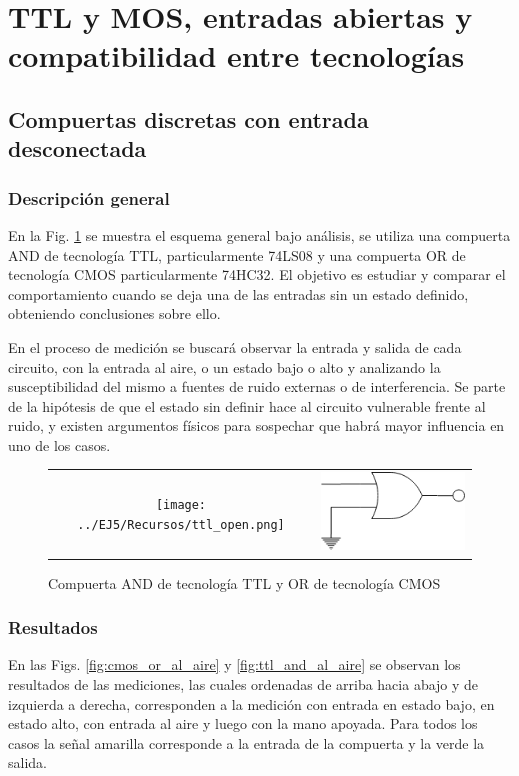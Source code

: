 \section{TTL y MOS, entradas abiertas y compatibilidad entre tecnolog\'ias}

\subsection{Compuertas discretas con entrada desconectada}

\subsubsection{Descripci\'on general}
En la Fig. \ref{fig:open_gate_circuits} se muestra el esquema general bajo an\'alisis, se utiliza una compuerta AND de tecnolog\'ia TTL,
particularmente 74LS08 y una compuerta OR de tecnolog\'ia CMOS particularmente 74HC32. El objetivo es estudiar y comparar el comportamiento
cuando se deja una de las entradas sin un estado definido, obteniendo conclusiones sobre ello.

En el proceso de medici\'on se buscar\'a observar la entrada y salida de cada circuito, con la entrada al aire, o un estado bajo o alto y analizando
la susceptibilidad del mismo a fuentes de ruido externas o de interferencia. Se parte de la hip\'otesis de que el estado sin definir hace al circuito vulnerable
frente al ruido, y existen argumentos f\'isicos para sospechar que habr\'a mayor influencia en uno de los casos.

\begin{figure}[H]
    \centering
    \begin{tabular}{c c}
        \texttt{[image: ../EJ5/Recursos/ttl\_open.png]} &
        \includegraphics[scale=0.8]{../EJ5/Recursos/cmos_open.png}
    \end{tabular}
    \caption{Compuerta AND de tecnolog\'ia TTL y OR de tecnolog\'ia CMOS}
    \label{fig:open_gate_circuits}
\end{figure}

\subsubsection{Resultados}
En las Figs. \ref{fig:cmos_or_al_aire} y \ref{fig:ttl_and_al_aire} se observan los resultados de las mediciones, las cuales ordenadas de arriba hacia abajo y de izquierda a derecha, corresponden a la medici\'on
con entrada en estado bajo, en estado alto, con entrada al aire y luego con la mano apoyada. Para todos los casos la se\~nal amarilla corresponde a la entrada de la compuerta y la verde la salida.

